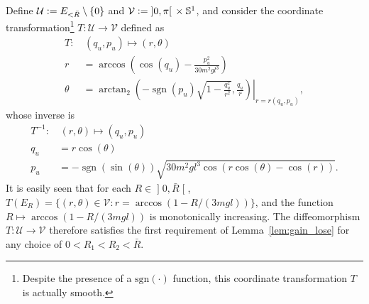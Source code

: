 \documentclass[journal,twoside,web, twocolumn]{ieeecolor}
\DeclareMathOperator{\Sign}{sgn}
\newcommand*{\sign}[1]{\Sign\left(#1\right)}
\newcommand*{\Sone}{\mathbb{S}^1}
\newcommand*{\cU}{\mathcal{U}}
\newcommand*{\cV}{\mathcal{V}}
\newcommand*{\rone}{r}%
\newcommand*{\eqdef}{\vcentcolon=}
\begin{document}
Define $\cU \eqdef E_{<\bar R} \setminus \{0\}$ and $\cV \eqdef
\mathopen]0,\pi\mathclose[ \, \times \Sone$, and consider the coordinate
transformation\footnote{Despite the presence of a $\text{sgn}(\cdot)$ function,
this coordinate transformation $T$ is actually smooth.} $T: \cU \to \cV$
defined as
\begin{equation}\label{eq:T1}
\begin{aligned}
T: & \, (q_u,p_u) \mapsto (r,\theta)  \\
%
r &= \arccos\left(\cos(q_u) - \frac{p_u^2}{30m^2gl^3}\right) \\
%
\theta &=\left.\arctan_2\left(-\sign{p_u}\sqrt{1-\frac{q_u^2}{r^2}},\frac{q_u}{r}\right)
    \right|_{r = \rone(q_u,p_u)},
\end{aligned}
\end{equation}
whose inverse is
\[
\begin{aligned}
T^{-1}: & \, (r,\theta) \mapsto (q_u,p_u)\\
%
q_u &= r \cos(\theta) \\
% 
p_u &=-\sign{\sin(\theta)} 
        \sqrt{30m^2gl^3\cos(r\cos(\theta) - \cos(r))}.
\end{aligned}
\]
It is easily seen that for each $R \in \mathopen ]0,\bar R\mathclose[$, 
$T(E_R) = \{(r,\theta)\in \cV : r = \arccos(1 - R/(3 m g l))\}$, and the function
$R \mapsto \arccos(1 - R/(3 m g l))$ is monotonically increasing. The
diffeomorphism
$T: \cU \to \cV$ therefore satisfies the first requirement of
Lemma~\ref{lem:gain_lose} for any choice of $0< R_1 < R_2 < \bar R$. 
\end{document}
